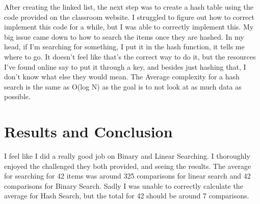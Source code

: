 \documentclass{article}
\begin{document}
After creating the linked list, the next step was to create a hash table using the code provided on the classroom website. I struggled to figure out how to correct implement this code for a while, but I was able to correctly implement this. My big issue came down to how to search the items once they are hashed. In my head, if I'm searching for something, I put it in the hash function, it tells me where to go. It doesn't feel like that's the correct way to do it, but the resources I've found online say to put it through a key, and besides just hashing that, I don't know what else they would mean. The Average complexity for a hash search is the same as O(log N) as the goal is to not look at as much data as possible. 
\section{Results and Conclusion}
I feel like I did a really good job on Binary and Linear Searching. I thoroughly enjoyed the challenged they both provided, and seeing the results. The average for searching for 42 items was around 325 comparisons for linear search and 42 comparisons for Binary Search. Sadly I was unable to correctly calculate the average for Hash Search, but the total for 42 should be around 7 comparisons. 
\end{document}
